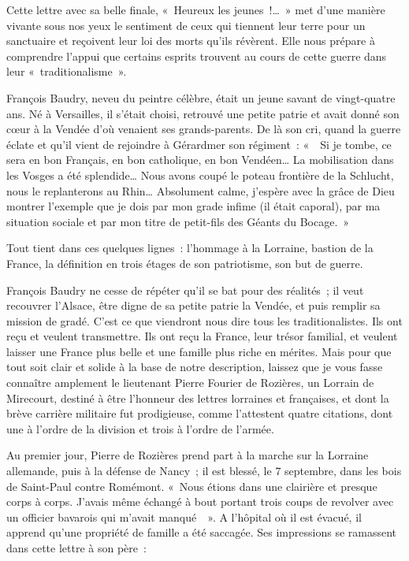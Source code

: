 \documentclass[french,twoside]{book} %
\begin{document}
\noindent Cette lettre avec sa belle finale, « Heureux les jeunes !… » met d’une manière vivante sous nos yeux le sentiment de ceux qui tiennent leur terre pour un sanctuaire et reçoivent leur loi des morts qu’ils révèrent. Elle nous prépare à comprendre l’appui que certains esprits trouvent au cours de cette guerre dans leur « traditionalisme ».‌\par
François Baudry, neveu du peintre célèbre, était un jeune savant de vingt-quatre ans. Né à Versailles, il s’était choisi, retrouvé une petite patrie et avait donné son cœur à la Vendée d’où venaient ses grands-parents. De là son cri, quand la guerre éclate et qu’il vient de rejoindre à Gérardmer son régiment : «  Si je tombe, ce sera en bon Français, en bon catholique, en bon Vendéen… La mobilisation dans les Vosges a été splendide… Nous avons coupé le poteau frontière de la Schlucht, nous le replanterons au Rhin… Absolument calme, j’espère avec la grâce de Dieu montrer l’exemple que je dois par mon grade infime (il était caporal), par ma situation sociale et par mon titre de petit-fils des Géants du Bocage. »‌\par
Tout tient dans ces quelques lignes : l’hommage à la Lorraine, bastion de la France, la définition en trois étages de son patriotisme, son but de guerre.‌\par
François Baudry ne cesse de répéter qu’il se bat pour des réalités ; il veut recouvrer l’Alsace, être digne de sa petite patrie la Vendée, et puis remplir sa mission de gradé. C’est ce que viendront nous dire tous les traditionalistes. Ils ont reçu et veulent transmettre. Ils ont reçu la France, leur trésor familial, et veulent laisser une France plus belle et une famille plus riche en mérites. Mais pour que tout soit clair et solide à la base de notre description, laissez que je vous fasse connaître amplement le lieutenant Pierre Fourier de Rozières, un Lorrain de Mirecourt, destiné à être l’honneur des lettres lorraines et françaises, et dont la brève carrière militaire fut prodigieuse, comme l’attestent quatre citations, dont une à l’ordre de la division et trois à l’ordre de l’armée.‌\par
Au premier jour, Pierre de Rozières prend part à la marche sur la Lorraine allemande, puis à la défense de Nancy ; il est blessé, le 7 septembre, dans les bois de Saint-Paul contre Romémont. « Nous étions dans une clairière et presque corps à corps. J’avais même échangé à bout portant trois coups de revolver avec un officier bavarois qui m’avait manqué  ». A l’hôpital où il est évacué, il apprend qu’une propriété de famille a été saccagée. Ses impressions se ramassent dans cette lettre à son père :‌\par
\end{document}
